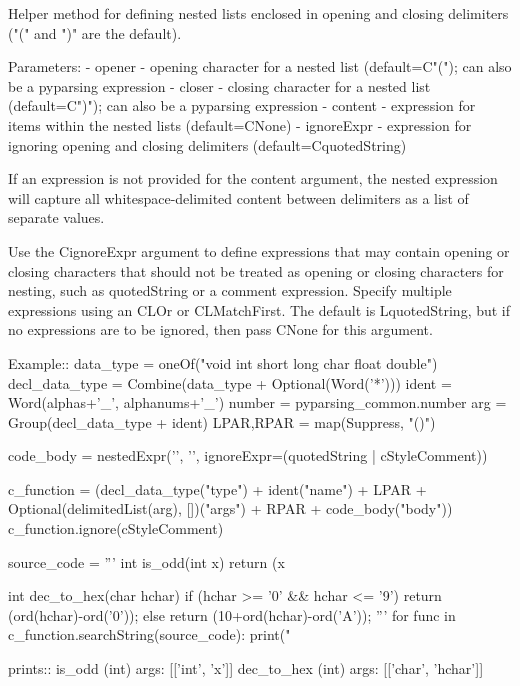 \begin{DoxyVerb}Helper method for defining nested lists enclosed in opening and closing
delimiters ("(" and ")" are the default).

Parameters:
 - opener - opening character for a nested list (default=C{"("}); can also be a pyparsing expression
 - closer - closing character for a nested list (default=C{")"}); can also be a pyparsing expression
 - content - expression for items within the nested lists (default=C{None})
 - ignoreExpr - expression for ignoring opening and closing delimiters (default=C{quotedString})

If an expression is not provided for the content argument, the nested
expression will capture all whitespace-delimited content between delimiters
as a list of separate values.

Use the C{ignoreExpr} argument to define expressions that may contain
opening or closing characters that should not be treated as opening
or closing characters for nesting, such as quotedString or a comment
expression.  Specify multiple expressions using an C{L{Or}} or C{L{MatchFirst}}.
The default is L{quotedString}, but if no expressions are to be ignored,
then pass C{None} for this argument.

Example::
    data_type = oneOf("void int short long char float double")
    decl_data_type = Combine(data_type + Optional(Word('*')))
    ident = Word(alphas+'_', alphanums+'_')
    number = pyparsing_common.number
    arg = Group(decl_data_type + ident)
    LPAR,RPAR = map(Suppress, "()")

    code_body = nestedExpr('{', '}', ignoreExpr=(quotedString | cStyleComment))

    c_function = (decl_data_type("type") 
                  + ident("name")
                  + LPAR + Optional(delimitedList(arg), [])("args") + RPAR 
                  + code_body("body"))
    c_function.ignore(cStyleComment)
    
    source_code = '''
        int is_odd(int x) { 
            return (x%
        }
            
        int dec_to_hex(char hchar) { 
            if (hchar >= '0' && hchar <= '9') { 
                return (ord(hchar)-ord('0')); 
            } else { 
                return (10+ord(hchar)-ord('A'));
            } 
        }
    '''
    for func in c_function.searchString(source_code):
        print("%

prints::
    is_odd (int) args: [['int', 'x']]
    dec_to_hex (int) args: [['char', 'hchar']]
\end{DoxyVerb}
 \mbox{\label{namespacesetuptools_1_1__vendor_1_1pyparsing_a3a21b9f56d8c5ba75db0a0fdaf32b1d6}} 
